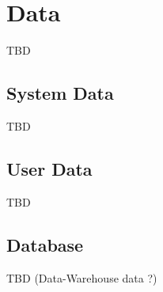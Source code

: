 \section{Data}
TBD

\subsection{System Data}
TBD

\subsection{User Data}
TBD

\subsection{Database}
TBD (Data-Warehouse data ?) 

